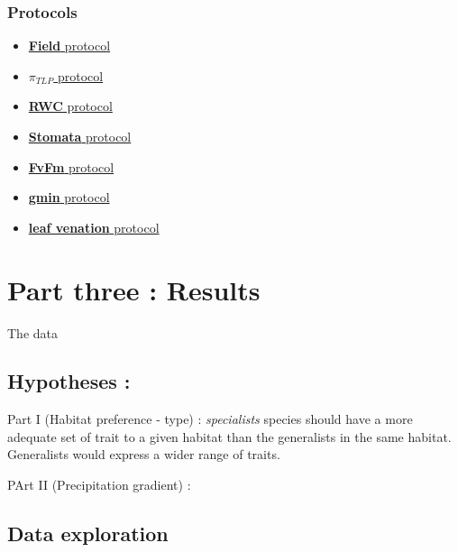 \documentclass[
]{book}
\providecommand{\tightlist}{%
  \setlength{\itemsep}{0pt}\setlength{\parskip}{0pt}}
\begin{document}
\hypertarget{protocols}{%
\section{Protocols}\label{protocols}}

\begin{itemize}
\tightlist
\item
  \href{../Metradica_Paracou/Document/Protocol/Field.Rmd}{\textbf{Field} protocol}
\item
  \href{../Metradica_Paracou/Document/Protocol/Protocole_Ptlp.pdf}{\textbf{\(\pi_{TLP}\)} protocol}
\item
  \href{../Metradica_Paracou/Document/Protocol/RWC_Boisseaux.docx}{\textbf{RWC} protocol}
\item
  \href{../Metradica_Paracou/Document/Protocol/Analyse\%20Stomates_Marion.docx}{\textbf{Stomata} protocol}
\item
  \href{../Metradica_Paracou/Document/Protocol/Fluo_Bellifa.docx}{\textbf{FvFm} protocol}
\item
  \href{../Metradica_Paracou/Document/Protocol/Gmin\%20protocol.docx}{\textbf{gmin} protocol}
\item
  \href{../Metradica_Paracou/Document/Protocol/ProtocolLeafVeins_MB_2.docx}{\textbf{leaf venation} protocol}
\end{itemize}

\hypertarget{part-part-three-results}{%
\part{Part three : Results}\label{part-part-three-results}}

The data

\hypertarget{hypotheses-1}{%
\chapter{Hypotheses :}\label{hypotheses-1}}

Part I (Habitat preference - type) : \emph{specialists} species should have a more adequate set of trait to a given habitat than the generalists in the same habitat. Generalists would express a wider range of traits.

PArt II (Precipitation gradient) :

\hypertarget{data-exploration}{%
\chapter{Data exploration}\label{data-exploration}}
\end{document}
